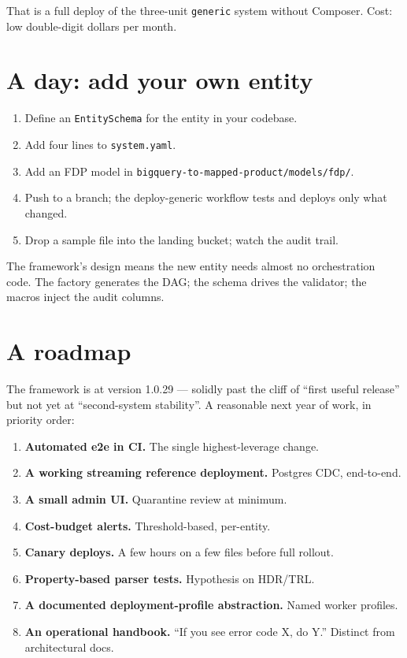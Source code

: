 \documentclass[
  11pt,
  british,
  oneside]{book}
\providecommand{\tightlist}{%
  \setlength{\itemsep}{0pt}\setlength{\parskip}{0pt}}
\begin{document}
That is a full deploy of the three-unit \texttt{generic} system without
Composer. Cost: low double-digit dollars per month.

\hypertarget{a-day-add-your-own-entity}{%
\section{A day: add your own entity}\label{a-day-add-your-own-entity}}

\begin{enumerate}
\def\labelenumi{\arabic{enumi}.}
\tightlist
\item
  Define an \texttt{EntitySchema} for the entity in your codebase.
\item
  Add four lines to \texttt{system.yaml}.
\item
  Add an FDP model in \texttt{bigquery-to-mapped-product/models/fdp/}.
\item
  Push to a branch; the deploy-generic workflow tests and deploys only
  what changed.
\item
  Drop a sample file into the landing bucket; watch the audit trail.
\end{enumerate}

The framework's design means the new entity needs almost no
orchestration code. The factory generates the DAG; the schema drives the
validator; the macros inject the audit columns.

\hypertarget{a-roadmap}{%
\section{A roadmap}\label{a-roadmap}}

The framework is at version 1.0.29 --- solidly past the cliff of ``first
useful release'' but not yet at ``second-system stability''. A
reasonable next year of work, in priority order:

\begin{enumerate}
\def\labelenumi{\arabic{enumi}.}
\tightlist
\item
  \textbf{Automated e2e in CI.} The single highest-leverage change.
\item
  \textbf{A working streaming reference deployment.} Postgres CDC,
  end-to-end.
\item
  \textbf{A small admin UI.} Quarantine review at minimum.
\item
  \textbf{Cost-budget alerts.} Threshold-based, per-entity.
\item
  \textbf{Canary deploys.} A few hours on a few files before full
  rollout.
\item
  \textbf{Property-based parser tests.} Hypothesis on HDR/TRL.
\item
  \textbf{A documented deployment-profile abstraction.} Named worker
  profiles.
\item
  \textbf{An operational handbook.} ``If you see error code X, do Y.''
  Distinct from architectural docs.
\end{enumerate}
\end{document}
